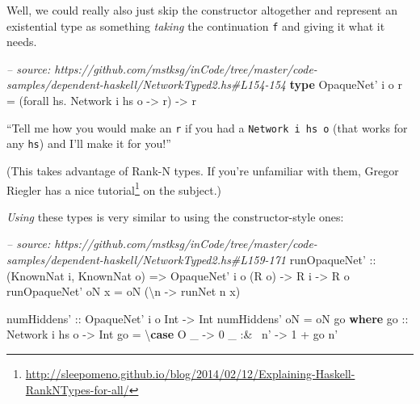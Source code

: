\documentclass[]{article}
\newenvironment{Shaded}{}{}
\newcommand{\KeywordTok}[1]{\textcolor[rgb]{0.00,0.44,0.13}{\textbf{{#1}}}}
\newcommand{\DataTypeTok}[1]{\textcolor[rgb]{0.56,0.13,0.00}{{#1}}}
\newcommand{\DecValTok}[1]{\textcolor[rgb]{0.25,0.63,0.44}{{#1}}}
\newcommand{\CommentTok}[1]{\textcolor[rgb]{0.38,0.63,0.69}{\textit{{#1}}}}
\newcommand{\OtherTok}[1]{\textcolor[rgb]{0.00,0.44,0.13}{{#1}}}
\newcommand{\FunctionTok}[1]{\textcolor[rgb]{0.02,0.16,0.49}{{#1}}}
\newcommand{\NormalTok}[1]{{#1}}
\renewcommand{\href}[2]{#2\footnote{\url{#1}}}
\begin{document}
Well, we could really also just skip the constructor altogether and represent an
existential type as something \emph{taking} the continuation \texttt{f} and
giving it what it needs.

\begin{Shaded}
\begin{Highlighting}[]
\CommentTok{-- source: https://github.com/mstksg/inCode/tree/master/code-samples/dependent-haskell/NetworkTyped2.hs#L154-154}
\KeywordTok{type} \DataTypeTok{OpaqueNet'} \NormalTok{i o r }\FunctionTok{=} \NormalTok{(forall hs}\FunctionTok{.} \DataTypeTok{Network} \NormalTok{i hs o }\OtherTok{->} \NormalTok{r) }\OtherTok{->} \NormalTok{r}
\end{Highlighting}
\end{Shaded}

``Tell me how you would make an \texttt{r} if you had a
\texttt{Network\ i\ hs\ o} (that works for any \texttt{hs}) and I'll make it for
you!''

(This takes advantage of Rank-N types. If you're unfamiliar with them, Gregor
Riegler has a
\href{http://sleepomeno.github.io/blog/2014/02/12/Explaining-Haskell-RankNTypes-for-all/}{nice
tutorial} on the subject.)

\emph{Using} these types is very similar to using the constructor-style ones:

\begin{Shaded}
\begin{Highlighting}[]
\CommentTok{-- source: https://github.com/mstksg/inCode/tree/master/code-samples/dependent-haskell/NetworkTyped2.hs#L159-171}
\OtherTok{runOpaqueNet' ::} \NormalTok{(}\DataTypeTok{KnownNat} \NormalTok{i, }\DataTypeTok{KnownNat} \NormalTok{o)}
              \OtherTok{=>} \DataTypeTok{OpaqueNet'} \NormalTok{i o (}\DataTypeTok{R} \NormalTok{o)}
              \OtherTok{->} \DataTypeTok{R} \NormalTok{i}
              \OtherTok{->} \DataTypeTok{R} \NormalTok{o}
\NormalTok{runOpaqueNet' oN x }\FunctionTok{=} \NormalTok{oN (\textbackslash{}n }\OtherTok{->} \NormalTok{runNet n x)}

\OtherTok{numHiddens' ::} \DataTypeTok{OpaqueNet'} \NormalTok{i o }\DataTypeTok{Int} \OtherTok{->} \DataTypeTok{Int}
\NormalTok{numHiddens' oN }\FunctionTok{=} \NormalTok{oN go}
  \KeywordTok{where}
\OtherTok{    go ::} \DataTypeTok{Network} \NormalTok{i hs o }\OtherTok{->} \DataTypeTok{Int}
    \NormalTok{go }\FunctionTok{=} \NormalTok{\textbackslash{}}\KeywordTok{case}
        \DataTypeTok{O} \NormalTok{_      }\OtherTok{->} \DecValTok{0}
        \NormalTok{_ }\FunctionTok{:&~} \NormalTok{n' }\OtherTok{->} \DecValTok{1} \FunctionTok{+} \NormalTok{go n'}
\end{Highlighting}
\end{Shaded}
\end{document}
